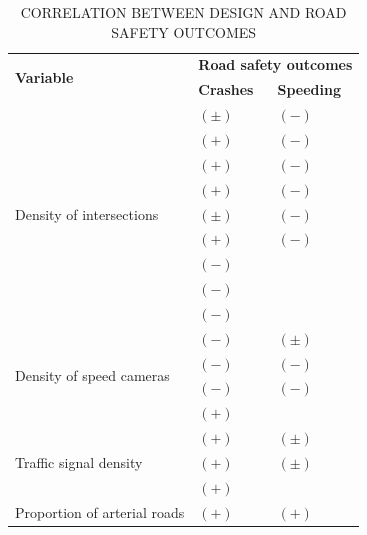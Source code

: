 \begin{table}[!hbtp]
    \footnotesize
    \captionsetup{justification=raggedright,
        singlelinecheck=false,
        font=footnotesize}
    \caption{CORRELATION BETWEEN DESIGN AND ROAD SAFETY OUTCOMES}
    \centering
    \begin{tabular}{p{2.5cm}p{6.2cm}p{6.2cm}}
        \hline
        \multicolumn{1}{l}{\multirow{2}{*}{\textbf{Variable}}} & \multicolumn{2}{c}{\textbf{Road safety outcomes}} \\
        \multicolumn{1}{c}{} & \textbf{Crashes} & \textbf{Speeding} \\ \hline
        \multirow{9}{2cm}{Density of intersections} & $(\pm)$ \textcite{Dumbaugh2009} & $(-)$ \textcite{Dumbaugh2009} \\
         & $(+)$ \textcite{Dumbaugh2011} & $(-)$ \textcite{Elvik2009} \\
         & $(+)$ \textcite{Dumbaugh2013} & $(-)$ \textcite{Ewing2009} \\
         & $(+)$ \textcite{Elvik2009} & $(-)$ \textcite{Huang2018} \\
         & $(\pm)$ \textcite{Ewing2009} & $(-)$ \textcite{Obelheiro2019} \\
         & $(+)$ \textcite{Huang2018} & $(-)$ \textcite{Obelheiro2020} \\
         & $(-)$ \textcite{Marshall2011} &  \\
         & $(-)$ \textcite{Ouyang2014} &  \\
         & $(-)$ \textcite{Zhang2015} &  \\ \hline
        \multirow{4}{2cm}{Density of speed cameras} & $(-)$ \textcite{Høye2015} & $(\pm)$ \textcite{Li2020} \\
         & $(-)$ \textcite{Li2013a} & $(-)$ \textcite{Li2013a} \\
         & $(-)$ \textcite{Li2020} & $(-)$ \textcite{Oliveira2015} \\
         & $(+)$ \textcite{Park2019} &  \\ \hline
        \multirow{3}{2cm}{Traffic signal density} & $(+)$ \textcite{Obelheiro2020} & $(\pm)$ \textcite{Elvik2009} \\
         & $(+)$ \textcite{Lovegrove2006} & $(\pm)$ \textcite{Furth2018} \\
         & $(+)$ \textcite{Lee2015} & \\ \hline
        \multirow{9}{2cm}{Proportion of arterial roads} & $(+)$ \textcite{Dumbaugh2009} & $(+)$ \textcite{Dumbaugh2011} \\

\end{tabular}
\end{table}
